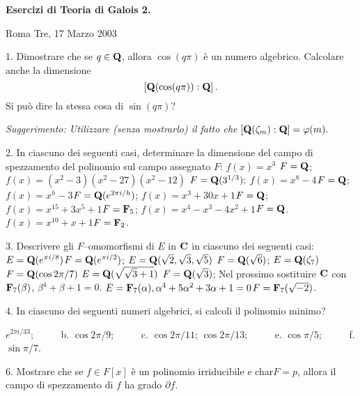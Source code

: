  \nopagenumbers
\def\frac#1#2{{#1\over#2}}
\def\Q{{\bf Q}}
\def\Z{{\bf Z}}
\def\N{{\bf N}}
\def\C{{\bf C}}
\def\F{{\bf F}}
\def\QQ{{\rm Q}}


\centerline{{\bf Esercizi di Teoria di Galois 2.}}\medskip

\centerline{Roma Tre, 17 Marzo 2003}\bigskip

\item{1.} Dimostrare che se $q\in\Q$, allora $\cos(q\pi)$ \`{e} un
numero algebrico. Calcolare anche la dimensione
$$\left[\Q(\cos(q\pi)):\Q\right].$$ Si pu\`{o} dire la stessa cosa
di $\sin(q\pi)$?

\hfill {\it Suggerimento: Utilizzare (senza mostrarlo) il  fatto
che $\left[\Q(\zeta_m):\Q\right]=\varphi(m).$}
\bigskip

\item{2.} In ciascuno dei seguenti casi, determinare la dimensione
del campo di spezzamento del polinomio sul campo assegnato $F$:
 $f(x)=x^3$ \hfill $F=\Q$; 
$f(x)=(x^2-3)(x^2-27)(x^2-12)$ \hfill $F=\Q(3^{1/3});$
 $f(x)=x^8-4$\hfill $F=\Q$; 
$f(x)=x^h-3$\hfill $F=\Q(e^{2\pi i/h})$; 
$f(x)=x^3+30x+1$\hfill $F=\Q$; 
$f(x)=x^{15}+3x^5+1$\hfill $F=\F_5$; 
$f(x)=x^4-x^3-4x^2+1$\hfill $F=\Q$.
 $f(x)=x^{10}+x+1$\hfill $F=\F_2$. %
\bigskip


\item{3.} Descrivere gli $F$--omomorfismi di $E$ in $\C$ in
ciascuno dei seguenti casi:  $E=\Q(e^{\pi
i/8})$\hfill $F=\Q(e^{\pi i/2})$;
\smallskip
{} $E=\Q(\sqrt{2},\sqrt{3},\sqrt{5})$ \hfill
$F=\Q(\sqrt{6})$;
\smallskip
{} $E=\Q(\zeta_7)$\hfill $F=\Q(\cos2\pi/7)$
\smallskip
{} $E=\Q(\sqrt{\sqrt{3}+1})$ \hfill $F=\Q(\sqrt{3})$;
\smallskip
Nel prossimo sostituire $\C$ con $\F_{7}(\beta)$,
$\beta^4+\beta+1=0$.  $E=\F_{7}(\alpha),
\alpha^4+5\alpha^2+3\alpha+1=0$\hfill $F=\F_7(\sqrt{-2})$.
\bigskip

\item{4.} In ciascuno dei seguenti numeri algebrici, si calcoli il
polinomio minimo?

 $e^{2\pi i/33}$; \ \ \ \ \ {b.} $\cos 2\pi/9$; \ \ \
\ \ {c.} $\cos 2\pi/11$; \medskip{} $\cos 2\pi/13$;
 \ \ \ \ \ {e.} $\cos \pi/5$;
 \ \ \ \ \ {f.} $\sin \pi/7$.
\bigskip

\item{6.} Mostrare che se $f\in F[x]$ \`{e} un polinomio
irriducibile e char$F=p$, allora il campo di spezzamento di $f$ ha
grado $\partial f$.

